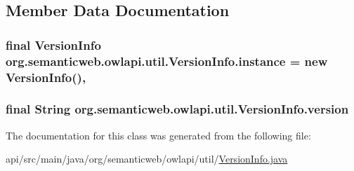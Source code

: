 \subsection{Member Data Documentation}
\hypertarget{classorg_1_1semanticweb_1_1owlapi_1_1util_1_1_version_info_a03417ea419a3df24a70be4459ca1be1d}{
\subsubsection[{instance}]{\setlength{\rightskip}{0pt plus 5cm}final {\bf Version\-Info} org.\-semanticweb.\-owlapi.\-util.\-Version\-Info.\-instance = new {\bf Version\-Info}()\hspace{0.3cm}{\ttfamily [static]}, {\ttfamily [private]}}}\label{classorg_1_1semanticweb_1_1owlapi_1_1util_1_1_version_info_a03417ea419a3df24a70be4459ca1be1d}
\hypertarget{classorg_1_1semanticweb_1_1owlapi_1_1util_1_1_version_info_aea1a5cd3849c501b13917dbfce69a09a}{
\subsubsection[{version}]{\setlength{\rightskip}{0pt plus 5cm}final String org.\-semanticweb.\-owlapi.\-util.\-Version\-Info.\-version\hspace{0.3cm}{\ttfamily [private]}}}\label{classorg_1_1semanticweb_1_1owlapi_1_1util_1_1_version_info_aea1a5cd3849c501b13917dbfce69a09a}


The documentation for this class was generated from the following file\-:\begin{DoxyCompactItemize}
\item 
api/src/main/java/org/semanticweb/owlapi/util/\hyperlink{_version_info_8java}{Version\-Info.\-java}\end{DoxyCompactItemize}
